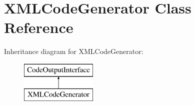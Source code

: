 \hypertarget{class_x_m_l_code_generator}{}\section{X\+M\+L\+Code\+Generator Class Reference}
\label{class_x_m_l_code_generator}
Inheritance diagram for X\+M\+L\+Code\+Generator\+:\begin{figure}[H]
\begin{center}
\leavevmode
\includegraphics[height=2.000000cm]{class_x_m_l_code_generator}
\end{center}
\end{figure}
